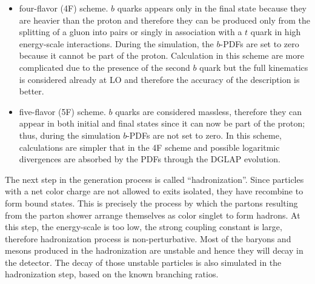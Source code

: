 \begin{itemize}

\item four-flavor (4F) scheme. $b$ quarks appears only in the final state because they are heavier than the proton and therefore they can be produced only from the splitting of a gluon into pairs or singly in association with a $t$ quark in high energy-scale interactions. During the simulation, the $b$-PDFs are set to zero because it cannot be part of the proton. Calculation in this scheme are more complicated due to the presence of the second $b$ quark but the full kinematics is considered already at LO and therefore the accuracy of the description is better.   

\item five-flavor (5F) scheme. $b$ quarks are considered massless, therefore they can appear in both initial and final states since it can now be part of the proton; thus, during the simulation $b$-PDFs are not set to zero. In this scheme, calculations are simpler that in the 4F scheme and possible logaritmic divergences are absorbed by the PDFs through the DGLAP evolution.   
\end{itemize}


\noindent The next step in the generation process is called ``hadronization''. Since particles with a net color charge are not allowed to exits isolated, they have recombine to form bound states. This is precisely the process by which the partons resulting from the parton shower arrange themselves as color singlet to form hadrons. At this step, the energy-scale is too low, the strong coupling constant is large, therefore hadronization process is non-perturbative. Most of the baryons and mesons produced in the hadronization are unstable and hence they will decay in the detector. The decay of those unstable particles is also simulated in the hadronization step, based on the known branching ratios.












